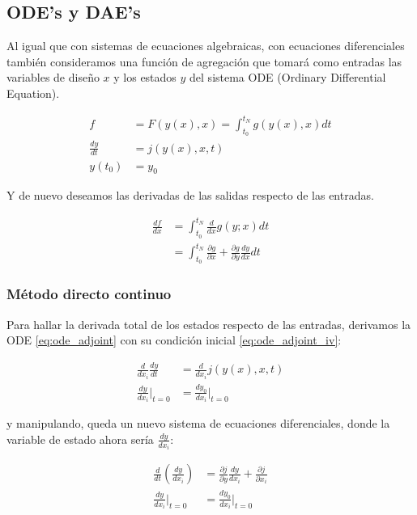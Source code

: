 \subsection{ODE's y DAE's}

Al igual que con sistemas de ecuaciones algebraicas, con ecuaciones
diferenciales también consideramos una función de agregación que tomará como
entradas las variables de diseño $x$ y los estados $y$ del sistema ODE
(Ordinary Differential Equation).

\begin{align}
	f             & = F(y(x), x) = \int_{t_0}^{t_N} g(y(x), x) dt \\
	\frac{dy}{dt} & = j(y(x), x, t)  \label{eq:ode_adjoint}       \\
	y(t_0)        & = y_0  \label{eq:ode_adjoint_iv}
\end{align}


Y de nuevo deseamos las derivadas de las salidas respecto de las entradas.


\begin{align}
	\frac{df}{dx} & = \int_{t_0}^{t_N} \frac{d}{dx} g(y;x) dt \nonumber                                                \\
	              & = \int_{t_0}^{t_N} \frac{\partial g}{\partial x} + \frac{\partial g}{\partial y} \frac{d y}{dx} dt
\end{align}


\subsubsection{Método directo continuo}

Para hallar la derivada total de los estados respecto de las entradas,
derivamos la ODE \eqref{eq:ode_adjoint} con su condición inicial \eqref{eq:ode_adjoint_iv}:

\begin{align}
	\frac{d}{dx_i} \frac{dy}{dt} & = \frac{d}{dx_i} j(y(x), x, t)   \\
	\frac{dy}{dx_i} \big|_{t=0}  & =  \frac{dy_0}{dx_i} \big|_{t=0}
\end{align}

y manipulando, queda un nuevo sistema de ecuaciones diferenciales, donde la
variable de estado ahora sería $\frac{dy}{dx_i}$:

\begin{align}
	\frac{d}{dt} \left( \frac{dy}{dx_i} \right) & = \frac{\partial j}{\partial y} \frac{dy}{dx_i} + \frac{\partial j}{\partial x_i} \\
	\frac{dy}{dx_i} \big|_{t=0}                 & = \frac{dy_0}{dx_i} \big|_{t=0}
\end{align}

